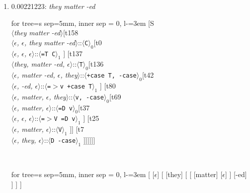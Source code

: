 \documentclass[11pt]{article}
\begin{document}
\begin{enumerate}
	\item  0.00221223: \textit{they matter -ed} \\[0.5em]
	\begin{adjustbox}{max width = \textwidth}
	\begin{forest}
	for tree={s sep=5mm, inner sep = 0, l-=3em}
	[S\\$\langle$\textit{they matter -ed}$\rangle$[t158\\$\langle$\textit{$\epsilon${,} $\epsilon${,} they matter -ed}$\rangle$::$\langle$\texttt{C}$\rangle_0$[t0\\$\langle$\textit{$\epsilon${,} $\epsilon${,} $\epsilon$}$\rangle$::$\langle$\texttt{{=}T C}$\rangle_1$ ] [t137\\$\langle$\textit{they{,} matter -ed{,} $\epsilon$}$\rangle$::$\langle$\texttt{T}$\rangle_0$[t136\\$\langle$\textit{$\epsilon${,} matter -ed{,} $\epsilon${,} they}$\rangle$::$\langle$\texttt{+case T{,} -case}$\rangle_0$[t42\\$\langle$\textit{$\epsilon${,} -ed{,} $\epsilon$}$\rangle$::$\langle$\texttt{{=}$>$v +case T}$\rangle_1$ ] [t80\\$\langle$\textit{$\epsilon${,} matter{,} $\epsilon${,} they}$\rangle$::$\langle$\texttt{v{,} -case}$\rangle_0$[t69\\$\langle$\textit{$\epsilon${,} matter{,} $\epsilon$}$\rangle$::$\langle$\texttt{{=}D v}$\rangle_0$[t37\\$\langle$\textit{$\epsilon${,} $\epsilon${,} $\epsilon$}$\rangle$::$\langle$\texttt{{=}$>$V {=}D v}$\rangle_1$ ] [t25\\$\langle$\textit{$\epsilon${,} matter{,} $\epsilon$}$\rangle$::$\langle$\texttt{V}$\rangle_1$ ]] [t7\\$\langle$\textit{$\epsilon${,} they{,} $\epsilon$}$\rangle$::$\langle$\texttt{D -case}$\rangle_1$ ]]]]]]
	\end{forest}
	\end{adjustbox}
	\\
	\begin{adjustbox}{max width = \textwidth}
	\begin{forest}
	for tree={s sep=5mm, inner sep = 0, l-=3em}
	[ [$\epsilon$] [ [they] [ [ [matter] [$\epsilon$] ] [-ed] ] ] ]
	\end{forest}
	\end{adjustbox}
	\newpage


\end{enumerate}
\end{document}
